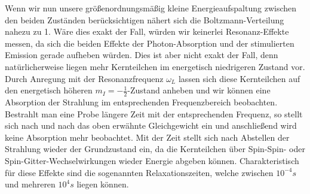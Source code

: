Wenn wir nun unsere größenordnungsmäßig kleine Energieaufspaltung zwischen den beiden Zuständen berücksichtigen nähert sich die Boltzmann-Verteilung nahezu zu 1. Wäre dies exakt der Fall, würden wir keinerlei Resonanz-Effekte messen, da sich die beiden Effekte der Photon-Absorption und der stimulierten Emission gerade aufheben würden. Dies ist aber nicht exakt der Fall, denn natürlicherweise liegen mehr Kernteilchen im energetisch niedrigeren Zustand vor. Durch Anregung mit der Resonanzfrequenz $\omega_L$ lassen sich diese Kernteilchen auf den energetisch höheren $m_I=-\frac{1}{2}$-Zustand anheben und wir können eine Absorption der Strahlung im entsprechenden Frequenzbereich beobachten. Bestrahlt man eine Probe längere Zeit mit der entsprechenden Frequenz, so stellt sich nach und nach das oben erwähnte Gleichgewicht ein und anschließend wird keine Absorption mehr  beobachtet. Mit der Zeit stellt sich nach Abstellen der Strahlung wieder der Grundzustand ein, da die Kernteilchen über Spin-Spin- oder Spin-Gitter-Wechselwirkungen wieder Energie abgeben können. Charakteristisch für diese Effekte sind die sogenannten Relaxationszeiten, welche zwischen $10^{-4}s$ und mehreren $10^4s$ liegen können.
